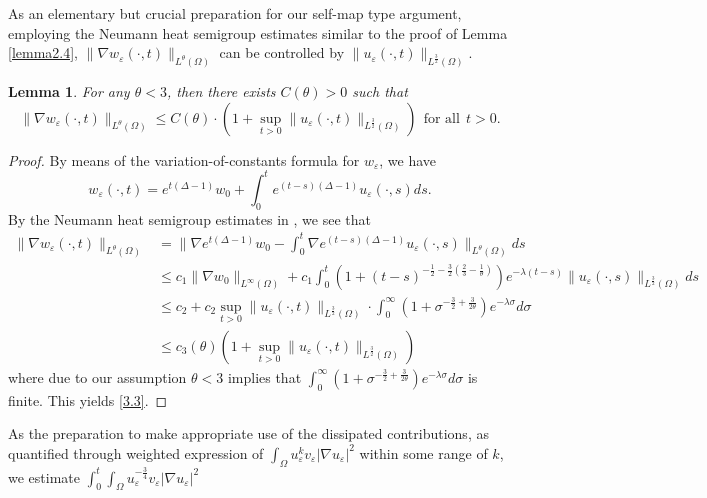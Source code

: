 \documentclass[12pt]{article}
\theoremstyle{plain}
\newtheorem{lemma}{Lemma}[section]
\theoremstyle{definition}
\numberwithin{equation}{section}
\begin{document}
As an elementary but crucial preparation for our self-map type argument, employing the Neumann heat semigroup estimates similar to the proof of Lemma \ref{lemma2.4},  $\|\nabla w_\varepsilon(\cdot,t)\|_{L^{\theta}(\Omega)}$ can be controlled by $\|u_\varepsilon(\cdot,t)\|_{L^{\frac3 2}(\Omega)}$.
\begin{lemma}\label{lemma3.2}
For any $\theta<3$, then there exists $C(\theta)>0$ such that
\begin{equation}\label{3.3}
    \|\nabla w_\varepsilon(\cdot,t)\|_{L^{\theta}(\Omega)}\leq C(\theta)\cdot(1+ \sup\limits_{t>0}\|u_\varepsilon(\cdot,t)\|_{L^{\frac{3}{2}}(\Omega)})~~\mbox{for all}~~t>0.
\end{equation}
\end{lemma}
\begin{proof}
By means of the variation-of-constants formula for $w_\varepsilon$, we have
	\begin{equation*}
		w_\varepsilon(\cdot,t)=e^{t(\Delta-1)}w_{0}+\int_{0}^{t}e^{(t-s)(\Delta-1)}u_\varepsilon(\cdot,s)ds.
	\end{equation*}
By the Neumann heat semigroup estimates in \cite{Winkler(2010)}, we see that
\begin{equation*}
\begin{split}
\|\nabla w_\varepsilon(\cdot,t)\|_{L^\theta(\Omega)}&=\big\|\nabla e^{t(\Delta-1)}w_0-\int_0^t\nabla e^{(t-s)(\Delta-1)}u_\varepsilon(\cdot,s)\big\|_{L^\theta(\Omega)}ds\\
&\leq c_1\|\nabla w_0\|_{L^\infty(\Omega)}+c_1\int_0^t(1+(t-s)^{-\frac1 2-\frac3 2(\frac2 3-\frac1 \theta)})e^{-\lambda(t-s)}\|u_\varepsilon(\cdot,s)\|_{L^{\frac3 2}(\Omega)}ds\\
&\leq c_2+c_2\sup\limits_{t>0}\|u_\varepsilon(\cdot,t)\|_{L^{\frac3 2}(\Omega)}\cdot \int_0^\infty(1+\sigma^{-\frac3 2+\frac3 {2\theta}})e^{-\lambda\sigma}d\sigma\\
&\leq c_3(\theta)(1+\sup\limits_{t>0}\|u_\varepsilon(\cdot,t)\|_{L^{\frac3 2}(\Omega)})
\end{split}
\end{equation*}
where due to our assumption $\theta<3$ implies that $\int_0^{\infty}(1+\sigma^{-\frac3 2+\frac3 {2\theta}})e^{-\lambda\sigma}d\sigma$ is finite. This yields \eqref{3.3}.
\end{proof}
As the preparation to make appropriate use of the dissipated contributions,  as quantified  through weighted expression of  $\int_{\Omega}u_\varepsilon^{k}v_\varepsilon|\nabla u_\varepsilon|^2$ within some range of $k$,
we  estimate $\int_0^{t}\int_\Omega u_\varepsilon^{-\frac3 4}v_\varepsilon|\nabla u_\varepsilon|^2$
\end{document}
